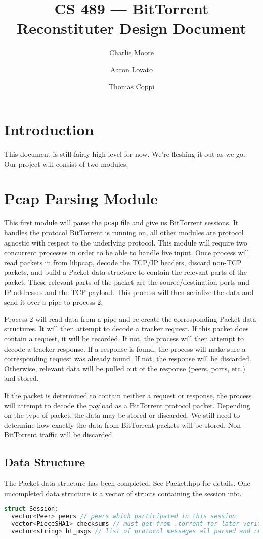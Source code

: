 \documentclass[11pt,titlepage]{article}
\author{Charlie Moore \and Aaron Lovato \and Thomas Coppi}
\title{CS 489 --- BitTorrent Reconstituter Design Document}
\begin{document}
\maketitle

\section{Introduction}
This document is still fairly high level for now.  We're fleshing it out as we
go.  Our project will consist of two modules.

\section{Pcap Parsing Module}
This first module will parse the \verb=pcap= file and give us BitTorrent
sessions.  It handles the protocol BitTorrent is running on, all other modules
are protocol agnostic with respect to the underlying protocol. This module will
require two concurrent processes in order to be able to handle live input. Once 
process will read packets in from libpcap, decode the TCP/IP headers, discard 
non-TCP packets, and build a Packet data structure to contain the relevant 
parts of the packet. These relevant parts of the packet are the 
source/destination ports and IP addresses and the TCP payload. This process 
will then serialize the data and send it over a pipe to process 2.

Process 2 will read data from a pipe and re-create the corresponding Packet data structures. It will then attempt to decode a tracker request. If this packet does contain a request, it will be recorded. If not, the process will then attempt to decode a tracker response. If a response is found, the process will make sure a corresponding request was already found. If not, the response will be discarded. Otherwise, relevant data will be pulled out of the response (peers, ports, etc.) and stored. 

If the packet is determined to contain neither a request or response, the 
process will attempt to decode the payload as a BitTorrent protocol packet. 
Depending on the type of packet, the data may be stored or discarded. We still 
need to determine how exactly the data from BitTorrent packets will be stored.
Non-BitTorrent traffic will be discarded.

\subsection{Data Structure}
The Packet data structure has been completed. See Packet.hpp for details. One uncompleted data structure is a vector of structs containing the session info.
\begin{lstlisting}[language=C++]
struct Session:
  vector<Peer> peers // peers which participated in this session
  vector<PieceSHA1> checksums // must get from .torrent for later verification
  vector<string> bt_msgs // list of protocol messages all parsed and ready
\end{lstlisting}
\end{document}
